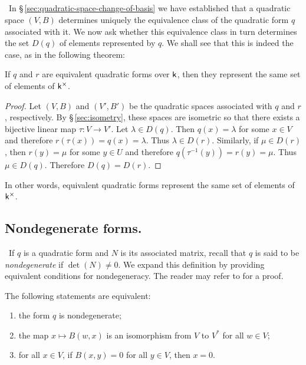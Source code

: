 \subsection{}~In \S\,\ref{sec:quadratic-space-change-of-basis} we have
established that a quadratic space \((V, B)\) determines uniquely the
equivalence class of the quadratic form \(q\) associated with it. We now ask
whether this equivalence class in turn determines the set \(D(q)\) of elements
represented by \(q\). We shall see that this is indeed the case, as in the
following theorem:\label{sec:equivalence-implies-same-representation}

\begin{theorem}
  If \(q\) and \(r\) are equivalent quadratic forms over \(\mathsf{k}\), then they
  represent the same set of elements of \(\mathsf{k}^{\times}\).
\end{theorem}

\begin{proof}
  Let \((V, B)\) and \((V', B')\) be the quadratic spaces associated with \(q\)
  and \(r\), respectively. By \S\,\ref{sec:isometry}, these spaces are isometric
  so that there exists a bijective linear map \(\tau: V \to V'\). Let \(\lambda
  \in D(q)\). Then \(q(x) = \lambda\) for some \(x \in V\) and therefore
  \(r(\tau(x)) = q(x) = \lambda\). Thus \(\lambda \in D(r)\). Similarly, if
  \(\mu \in D(r)\), then \(r(y) = \mu\) for some \(y \in U\) and therefore
  \(q(\tau^{-1}(y)) = r(y) = \mu\). Thus \(\mu \in D(q)\). Therefore \(D(q) =
  D(r)\).
\end{proof}

In other words, equivalent quadratic forms represent the same set of elements of
\(\mathsf{k}^{\times}\).

\subsection{Nondegenerate forms.}~If \(q\) is a quadratic form and \(N\) is its
associated matrix, recall that \(q\) is said to be \emph{nondegenerate} if
\(\det(N) \neq 0\). We expand this definition by providing equivalent conditions
for nondegeneracy.\label{sec:nondegenerate} The reader may refer to
\cite[p.~6]{lam1973quadratic} for a proof.

\begin{theorem}\label{thm:nondegenerate} The following statements are
    equivalent:

    \smallskip

    \begin{enumerate}[nosep, label=(\alph*)]
        \item the form \(q\) is nondegenerate;
        \item the map \(x \mapsto B(w, x)\) is an isomorphism from \(V\) to
        \(V^*\) for all \(w \in V\);
        \item for all \(x \in V\), if \(B(x, y) = 0\) for all \(y \in V\), then
        \(x = 0\).
    \end{enumerate}
\end{theorem}

